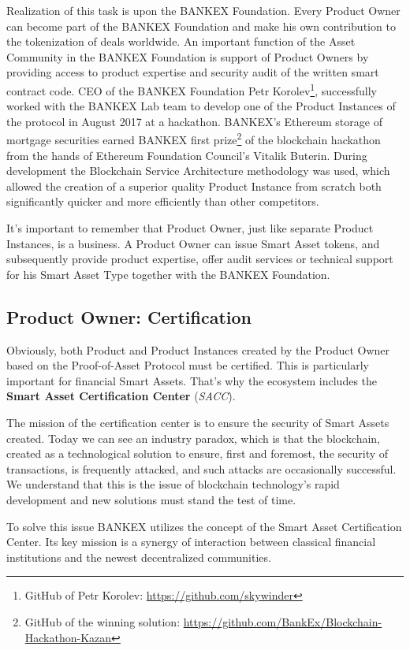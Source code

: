 \documentclass{article}
\begin{document}
\begin{multicols}{2}
Realization of this task is upon the BANKEX Foundation. Every Product Owner can become part of the BANKEX Foundation and make his own contribution to the tokenization of deals worldwide. An important function of the Asset Community in the BANKEX Foundation is support of Product Owners by providing access to product expertise and security audit of the written smart contract code.
CEO of the BANKEX Foundation Petr Korolev\footnote{GitHub of Petr Korolev: \url{https://github.com/skywinder}}, successfully worked with the BANKEX Lab team to develop one of the Product Instances of the protocol in August 2017 at a hackathon. BANKEX’s Ethereum storage of mortgage securities earned BANKEX first prize\footnote{GitHub of the winning solution: \url{https://github.com/BankEx/Blockchain-Hackathon-Kazan}} of the blockchain hackathon from the hands of Ethereum Foundation Council’s Vitalik Buterin. During development the Blockchain Service Architecture methodology was used, which allowed the creation of a superior quality Product Instance from scratch both significantly quicker and more efficiently than other competitors.

It's important to remember that Product Owner, just like separate Product Instances, is a business. A Product Owner can issue Smart Asset tokens, and subsequently provide product expertise, offer audit services or technical support for his Smart Asset Type together with the BANKEX Foundation.

\subsection{Product Owner: Certification}

Obviously, both Product and Product Instances created by the Product Owner based on the Proof-of-Asset Protocol must be certified. This is particularly important for financial Smart Assets. That’s why the ecosystem includes the \textbf{Smart Asset Certification Center} (\textit{SACC}).

The mission of the certification center is to ensure the security of Smart Assets created. Today we can see an industry paradox, which is that the blockchain, created as a technological solution to ensure, first and foremost, the security of transactions, is frequently attacked, and such attacks are occasionally successful. We understand that this is the issue of blockchain technology's rapid development and new solutions must stand the test of time.

To solve this issue BANKEX utilizes the concept of the Smart Asset Certification Center. Its key mission is a synergy of interaction between classical financial institutions and the newest decentralized communities.


\end{multicols}
\end{document}
